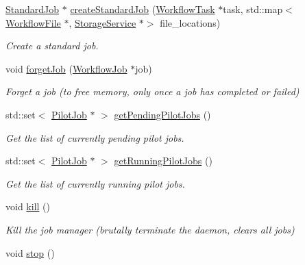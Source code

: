 \begin{DoxyCompactItemize}
\hyperlink{classwrench_1_1_standard_job}{Standard\+Job} $\ast$ \hyperlink{classwrench_1_1_job_manager_a42271d359373df86fdb59aeeaf0a4abc}{create\+Standard\+Job} (\hyperlink{classwrench_1_1_workflow_task}{Workflow\+Task} $\ast$task, std\+::map$<$ \hyperlink{classwrench_1_1_workflow_file}{Workflow\+File} $\ast$, \hyperlink{classwrench_1_1_storage_service}{Storage\+Service} $\ast$$>$ file\+\_\+locations)
\begin{DoxyCompactList}\small\item\em Create a standard job. \end{DoxyCompactList}\item 
void \hyperlink{classwrench_1_1_job_manager_ab10f770cc7ce3c022f889ad9cc3fcf0b}{forget\+Job} (\hyperlink{classwrench_1_1_workflow_job}{Workflow\+Job} $\ast$job)
\begin{DoxyCompactList}\small\item\em Forget a job (to free memory, only once a job has completed or failed) \end{DoxyCompactList}\item 
std\+::set$<$ \hyperlink{classwrench_1_1_pilot_job}{Pilot\+Job} $\ast$ $>$ \hyperlink{classwrench_1_1_job_manager_ad7f55858aa45b87289d5f35c4ccfad56}{get\+Pending\+Pilot\+Jobs} ()
\begin{DoxyCompactList}\small\item\em Get the list of currently pending pilot jobs. \end{DoxyCompactList}\item 
std\+::set$<$ \hyperlink{classwrench_1_1_pilot_job}{Pilot\+Job} $\ast$ $>$ \hyperlink{classwrench_1_1_job_manager_aeb91b23edf40378e49929f47e95f1ea6}{get\+Running\+Pilot\+Jobs} ()
\begin{DoxyCompactList}\small\item\em Get the list of currently running pilot jobs. \end{DoxyCompactList}\item 
\mbox{\label{classwrench_1_1_job_manager_a7d82fbb044c3fa275f423911b79a7e5c}} 
void \hyperlink{classwrench_1_1_job_manager_a7d82fbb044c3fa275f423911b79a7e5c}{kill} ()
\begin{DoxyCompactList}\small\item\em Kill the job manager (brutally terminate the daemon, clears all jobs) \end{DoxyCompactList}\item 
void \hyperlink{classwrench_1_1_job_manager_af9c85f6a54e26f115fa09ef1c9327aa7}{stop} ()
$$
\end{DoxyCompactItemize}
